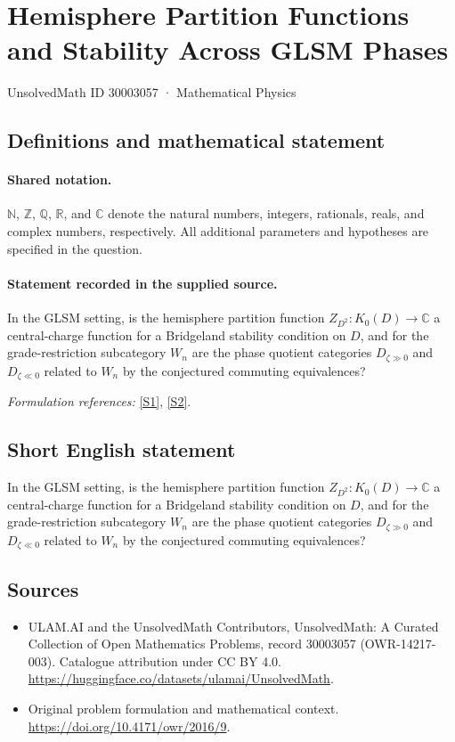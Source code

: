 \documentclass[11pt]{article}
\newcommand{\sref}[2]{\hyperlink{source:#1:#2}{[S#2]}}
\begin{document}
\setcounter{section}{30003056}
\section{Hemisphere Partition Functions and Stability Across GLSM Phases}\label{30003057}
{\small UnsolvedMath ID 30003057 · Mathematical Physics}
\subsection{Definitions and mathematical statement}

\paragraph{Shared notation.}$\mathbb N$, $\mathbb Z$, $\mathbb Q$, $\mathbb R$, and $\mathbb C$ denote the natural numbers, integers, rationals, reals, and complex numbers, respectively. All additional parameters and hypotheses are specified in the question.


\paragraph{Statement recorded in the supplied source.}
In the GLSM setting, is the hemisphere partition function $Z_{D^2}:K_0(D)\to\mathbb C$ a central-charge function for a Bridgeland stability condition on $D$, and for the grade-restriction subcategory $W_n$ are the phase quotient categories $D_{\zeta\gg0}$ and $D_{\zeta\ll0}$ related to $W_n$ by the conjectured commuting equivalences?
\par\smallskip\textit{Formulation references:} \sref{30003057}{1}, \sref{30003057}{2}.
\subsection{Short English statement}
In the GLSM setting, is the hemisphere partition function $Z_{D^2}:K_0(D)\to\mathbb C$ a central-charge function for a Bridgeland stability condition on $D$, and for the grade-restriction subcategory $W_n$ are the phase quotient categories $D_{\zeta\gg0}$ and $D_{\zeta\ll0}$ related to $W_n$ by the conjectured commuting equivalences?
\subsection{Sources}
\begin{itemize}
\item[\hypertarget{source:30003057:1}{S1}] ULAM.AI and the UnsolvedMath Contributors, UnsolvedMath: A Curated Collection of Open Mathematics Problems, record 30003057 (OWR-14217-003). Catalogue attribution under CC BY 4.0.
\url{https://huggingface.co/datasets/ulamai/UnsolvedMath}.
\item[\hypertarget{source:30003057:2}{S2}] Original problem formulation and mathematical context.
\url{https://doi.org/10.4171/owr/2016/9}.
\end{itemize}
\label{end:30003057}
\end{document}
